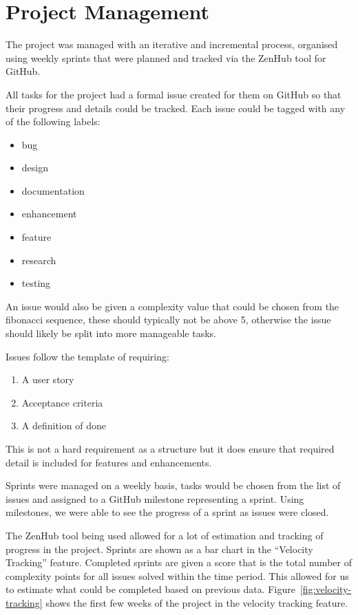 \section{Project Management}\label{sec:project-management}
The project was managed with an iterative and incremental process, organised using weekly sprints that were planned and tracked via the ZenHub\cite{_zenhub_????} tool for GitHub.

All tasks for the project had a formal issue created for them on GitHub so that their progress and details could be tracked. Each issue could be tagged with any of the following labels:
\begin{itemize}
  \item bug
  \item design
  \item documentation
  \item enhancement
  \item feature
  \item research
  \item testing
\end{itemize}
An issue would also be given a complexity value that could be chosen from the fibonacci sequence, these should typically not be above 5, otherwise the issue should likely be split into more manageable tasks.

Issues follow the template of requiring:
\begin{enumerate}
  \item A user story
  \item Acceptance criteria
  \item A definition of done
\end{enumerate}
This is not a hard requirement as a structure but it does ensure that required detail is included for features and enhancements.

Sprints were managed on a weekly basis, tasks would be chosen from the list of issues and assigned to a GitHub milestone representing a sprint. Using milestones, we were able to see the progress of a sprint as issues were closed.

The ZenHub tool being used allowed for a lot of estimation and tracking of progress in the project. Sprints are shown as a bar chart in the ``Velocity Tracking'' feature. Completed sprints are given a score that is the total number of complexity points for all issues solved within the time period. This allowed for us to estimate what could be completed based on previous data. Figure~\vref{fig:velocity-tracking} shows the first few weeks of the project in the velocity tracking feature.

